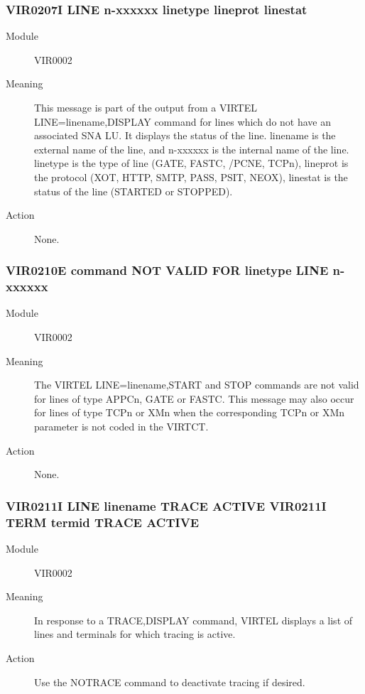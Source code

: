 \documentclass[letterpaper,10pt,english]{sphinxmanual}
\begin{document}
\subsubsection{VIR0207I LINE n-xxxxxx linetype lineprot linestat}
\label{\detokenize{messages:vir0207i-line-n-xxxxxx-linetype-lineprot-linestat}}\begin{description}
\item[{Module}] \leavevmode
VIR0002

\item[{Meaning}] \leavevmode
This message is part of the output from a VIRTEL LINE=linename,DISPLAY command for lines which do not have an associated SNA LU. It displays the status of the line. linename is the external name of the line, and n-xxxxxx is the internal name of the line. linetype is the type of line (GATE, FASTC, /PCNE, TCPn), lineprot is the protocol (XOT, HTTP, SMTP, PASS, PSIT, NEOX), linestat is the status of the line (STARTED or STOPPED).

\item[{Action}] \leavevmode
None.

\end{description}


\subsubsection{VIR0210E command NOT VALID FOR linetype LINE n-xxxxxx}
\label{\detokenize{messages:vir0210e-command-not-valid-for-linetype-line-n-xxxxxx}}\begin{description}
\item[{Module}] \leavevmode
VIR0002

\item[{Meaning}] \leavevmode
The VIRTEL LINE=linename,START and STOP commands are not valid for lines of type APPCn, GATE or FASTC. This message may also occur for lines of type TCPn or XMn when the corresponding TCPn or XMn parameter is not coded in the VIRTCT.

\item[{Action}] \leavevmode
None.

\end{description}


\subsubsection{VIR0211I LINE linename TRACE ACTIVE VIR0211I TERM termid TRACE ACTIVE}
\label{\detokenize{messages:vir0211i-line-linename-trace-active-vir0211i-term-termid-trace-active}}\begin{description}
\item[{Module}] \leavevmode
VIR0002

\item[{Meaning}] \leavevmode
In response to a TRACE,DISPLAY command, VIRTEL displays a list of lines and terminals for which tracing is active.

\item[{Action}] \leavevmode
Use the NOTRACE command to deactivate tracing if desired.

\end{description}
\end{document}
